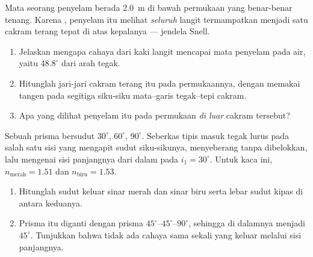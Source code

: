 \begin{exercise}[$\star\star\star$]\label{exo:g10:refraction:12}
Mata seorang penyelam berada \qty{2.0}{m} di bawah permukaan yang
benar-benar tenang. Karena , penyelam itu melihat
\emph{seluruh} langit termampatkan menjadi satu cakram terang tepat di
atas kepalanya --- jendela Snell.
\begin{enumerate}
  \item Jelaskan mengapa cahaya dari kaki langit mencapai mata penyelam
        pada  air, yaitu $48.8^\circ$ dari arah tegak.
  \item Hitunglah jari-jari cakram terang itu pada permukaannya, dengan
        memakai tangen pada segitiga siku-siku mata--garis tegak--tepi
        cakram.
  \item Apa yang dilihat penyelam itu pada permukaan \emph{di luar}
        cakram tersebut?
\end{enumerate}
\end{exercise}

\begin{exercise}[$\star\star\star$]\label{exo:g10:refraction:13}
Sebuah prisma bersudut $30^\circ$, $60^\circ$, $90^\circ$. Seberkas
tipis  masuk tegak lurus pada salah satu sisi yang mengapit
sudut siku-sikunya, menyeberang tanpa dibelokkan, lalu mengenai sisi
panjangnya dari dalam pada $i_1 = 30^\circ$. Untuk kaca ini,
$n_{\text{merah}} = 1.51$ dan $n_{\text{biru}} = 1.53$.
\begin{enumerate}
  \item Hitunglah sudut keluar sinar merah dan sinar biru serta lebar
        sudut kipas di antara keduanya.
  \item Prisma itu diganti dengan prisma
        $45^\circ$--$45^\circ$--$90^\circ$, sehingga  di
        dalamnya menjadi $45^\circ$. Tunjukkan bahwa tidak ada cahaya
        sama sekali yang keluar melalui sisi panjangnya.
\end{enumerate}
\end{exercise}

